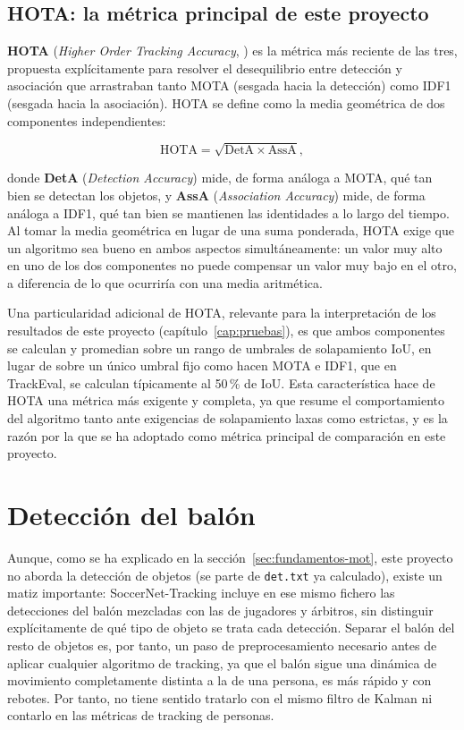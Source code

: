 \subsection{HOTA: la métrica principal de este proyecto}
\label{subsec:fundamentos-hota}

\textbf{HOTA} (\emph{Higher Order Tracking Accuracy},
\citealp{luiten2021hota, luiten2021hotablog}) es la métrica más reciente de las tres, propuesta
explícitamente para resolver el desequilibrio entre detección y asociación
que arrastraban tanto MOTA (sesgada hacia la detección) como IDF1 (sesgada
hacia la asociación). HOTA se define como la media geométrica de dos
componentes independientes:

\begin{equation}
\mathrm{HOTA} = \sqrt{\mathrm{DetA} \times \mathrm{AssA}},
\label{eq:fundamentos-hota}
\end{equation}

donde \textbf{DetA} (\emph{Detection Accuracy}) mide, de forma análoga a
MOTA, qué tan bien se detectan los objetos, y \textbf{AssA}
(\emph{Association Accuracy}) mide, de forma análoga a IDF1, qué tan bien
se mantienen las identidades a lo largo del tiempo. Al tomar la media
geométrica en lugar de una suma ponderada, HOTA exige que un algoritmo sea
bueno en ambos aspectos simultáneamente: un valor muy alto en uno de
los dos componentes no puede compensar un valor muy bajo en el otro, a
diferencia de lo que ocurriría con una media aritmética.

Una particularidad adicional de HOTA, relevante para la interpretación de
los resultados de este proyecto (capítulo~\ref{cap:pruebas}), es que ambos
componentes se calculan y promedian sobre un rango de umbrales de
solapamiento IoU, en lugar
de sobre un único umbral fijo como hacen MOTA e IDF1, que en TrackEval,
se calculan típicamente al 50\,\%
de IoU. Esta característica hace de HOTA una métrica más exigente y
completa, ya que resume el comportamiento del algoritmo tanto ante
exigencias de solapamiento laxas como estrictas, y es la razón por la que
se ha adoptado como métrica principal de comparación en este proyecto.

\section{Detección del balón}
\label{subsec:fundamentos-balon}

Aunque, como se ha explicado en la sección~\ref{sec:fundamentos-mot}, este
proyecto no aborda la detección de objetos (se parte de \texttt{det.txt}
ya calculado), existe un matiz importante: SoccerNet-Tracking incluye en
ese mismo fichero las detecciones del balón mezcladas con las de jugadores
y árbitros, sin distinguir explícitamente de qué tipo de objeto se trata
cada detección. Separar el balón del resto de objetos es, por tanto, un
paso de preprocesamiento necesario antes de aplicar cualquier algoritmo de
tracking, ya que el balón sigue una dinámica de movimiento completamente
distinta a la de una persona, es más rápido y con rebotes. Por tanto,
no tiene sentido
tratarlo con el mismo filtro de Kalman ni contarlo en las métricas de
tracking de personas.


